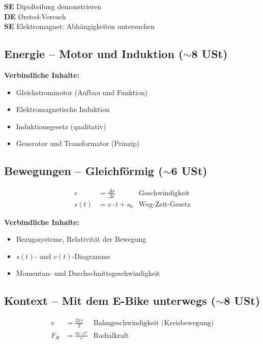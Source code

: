 \documentclass[11pt,a4paper]{article}
\newcommand{\SE}{\textcolor{accentgreen}{\textbf{SE}}}
\newcommand{\DE}{\textcolor{physikblue}{\textbf{DE}}}
\begin{document}
\begin{experimentbox}
\SE{} Dipolteilung demonstrieren\\
\DE{} Ørsted-Versuch\\
\SE{} Elektromagnet: Abhängigkeiten untersuchen
\end{experimentbox}

\subsection{Energie -- Motor und Induktion ($\sim$8 USt)}

\textbf{Verbindliche Inhalte:}
\begin{itemize}[leftmargin=0.5cm, itemsep=1pt]
\item Gleichstrommotor (Aufbau und Funktion)
\item Elektromagnetische Induktion
\item Induktionsgesetz (qualitativ)
\item Generator und Transformator (Prinzip)
\end{itemize}

\subsection{Bewegungen -- Gleichförmig ($\sim$6 USt)}

\begin{formelbox}
\begin{align*}
v &= \frac{\Delta s}{\Delta t} & \text{Geschwindigkeit} \\
s(t) &= v \cdot t + s_0 & \text{Weg-Zeit-Gesetz}
\end{align*}
\end{formelbox}

\textbf{Verbindliche Inhalte:}
\begin{itemize}[leftmargin=0.5cm, itemsep=1pt]
\item Bezugssysteme, Relativität der Bewegung
\item $s(t)$- und $v(t)$-Diagramme
\item Momentan- und Durchschnittsgeschwindigkeit
\end{itemize}

\subsection{Kontext -- Mit dem E-Bike unterwegs ($\sim$8 USt)}

\begin{formelbox}
\begin{align*}
v &= \frac{2\pi r}{T} & \text{Bahngeschwindigkeit (Kreisbewegung)} \\
F_R &= \frac{m \cdot v^2}{r} & \text{Radialkraft}
\end{align*}
\end{formelbox}
\end{document}
